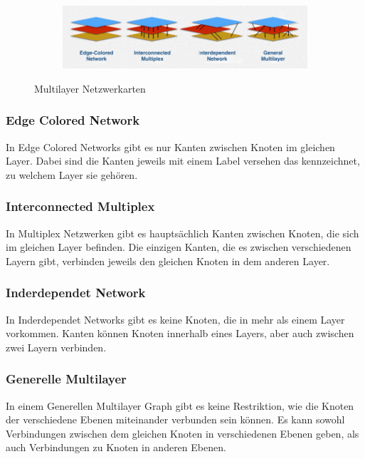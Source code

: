 \begin{figure}
  \centering
  \begin{subfigure}[b]{1.0\textwidth}
    \includegraphics[width=1.0\linewidth]{img/network_types.png}
  \end{subfigure}
  \caption{Multilayer Netzwerkarten \cite{muxVizBild}}
  \label{network_types}
\end{figure}

\subsubsection{Edge Colored Network}

In Edge Colored Networks gibt es nur Kanten zwischen Knoten im gleichen Layer. Dabei sind die Kanten jeweils mit einem Label versehen das kennzeichnet, zu welchem Layer sie gehören.


\subsubsection{Interconnected Multiplex}

In Multiplex Netzwerken gibt es hauptsächlich Kanten zwischen Knoten, die sich im gleichen Layer befinden. Die einzigen Kanten, die es zwischen verschiedenen Layern gibt, verbinden jeweils den gleichen Knoten in dem anderen Layer. 

\subsubsection{Inderdependet Network}

In Inderdependet Networks gibt es keine Knoten, die in mehr als einem Layer vorkommen. Kanten können Knoten innerhalb eines Layers, aber auch zwischen zwei Layern verbinden.

\subsubsection{Generelle Multilayer}
In einem Generellen Multilayer Graph gibt es keine Restriktion, wie die Knoten der verschiedene Ebenen miteinander verbunden sein können. Es kann sowohl Verbindungen zwischen dem gleichen Knoten in verschiedenen Ebenen geben, als auch Verbindungen zu Knoten in anderen Ebenen.


